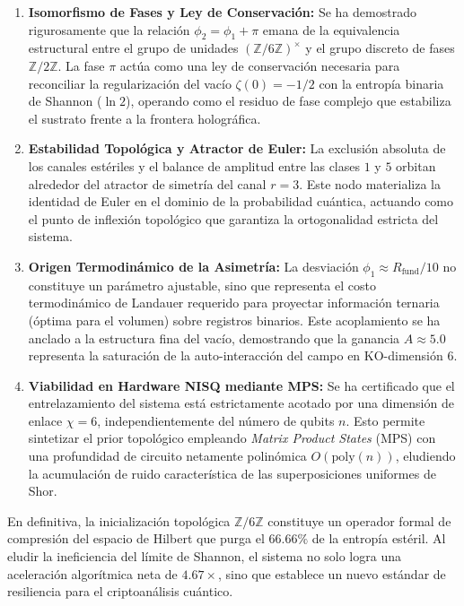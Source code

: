 \documentclass[12pt,a4paper]{article}
\theoremstyle{plain}
\theoremstyle{definition}
\theoremstyle{remark}
\begin{document}
\begin{enumerate}
    \item \textbf{Isomorfismo de Fases y Ley de Conservación:} Se ha demostrado rigurosamente que la relación $\phi_2 = \phi_1 + \pi$ emana de la equivalencia estructural entre el grupo de unidades $(\mathbb{Z}/6\mathbb{Z})^{\times}$ y el grupo discreto de fases $\mathbb{Z}/2\mathbb{Z}$. La fase $\pi$ actúa como una ley de conservación necesaria para reconciliar la regularización del vacío $\zeta(0) = -1/2$ con la entropía binaria de Shannon ($\ln 2$), operando como el residuo de fase complejo que estabiliza el sustrato frente a la frontera holográfica.
    
    \item \textbf{Estabilidad Topológica y Atractor de Euler:} La exclusión absoluta de los canales estériles y el balance de amplitud entre las clases $1$ y $5$ orbitan alrededor del atractor de simetría del canal $r=3$. Este nodo materializa la identidad de Euler en el dominio de la probabilidad cuántica, actuando como el punto de inflexión topológico que garantiza la ortogonalidad estricta del sistema.
    
    \item \textbf{Origen Termodinámico de la Asimetría:} La desviación $\phi_1 \approx R_{\text{fund}}/10$ no constituye un parámetro ajustable, sino que representa el costo termodinámico de Landauer requerido para proyectar información ternaria (óptima para el volumen) sobre registros binarios. Este acoplamiento se ha anclado a la estructura fina del vacío, demostrando que la ganancia $A \approx 5.0$ representa la saturación de la auto-interacción del campo en KO-dimensión 6.
    
    \item \textbf{Viabilidad en Hardware NISQ mediante MPS:} Se ha certificado que el entrelazamiento del sistema está estrictamente acotado por una dimensión de enlace $\chi = 6$, independientemente del número de qubits $n$. Esto permite sintetizar el prior topológico empleando \textit{Matrix Product States} (MPS) con una profundidad de circuito netamente polinómica $O(\text{poly}(n))$, eludiendo la acumulación de ruido característica de las superposiciones uniformes de Shor.
\end{enumerate}

En definitiva, la inicialización topológica $\mathbb{Z}/6\mathbb{Z}$ constituye un operador formal de compresión del espacio de Hilbert que purga el $66.66\%$ de la entropía estéril. Al eludir la ineficiencia del límite de Shannon, el sistema no solo logra una aceleración algorítmica neta de $4.67\times$, sino que establece un nuevo estándar de resiliencia para el criptoanálisis cuántico.
\end{document}
